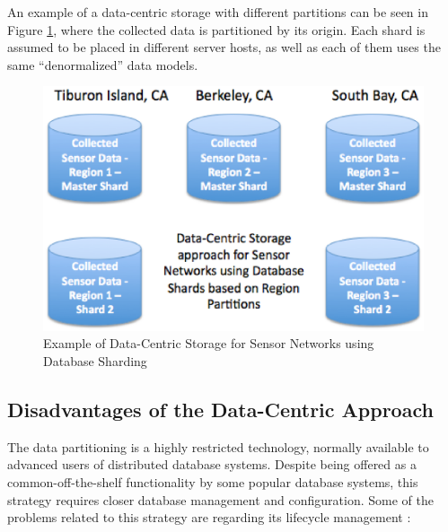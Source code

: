An example of a data-centric storage with different partitions can be seen in
Figure \ref{fig:database-sharding-by-region}, where the collected data is
partitioned by its origin. Each shard is assumed to be placed in different
server hosts, as well as each of them uses the same ``denormalized'' data
models.

\begin{figure}
  \centering
  \includegraphics[scale=0.5]{../diagrams/database-sharding-by-region}
  \caption{Example of Data-Centric Storage for Sensor Networks using Database
  Sharding}
  \label{fig:database-sharding-by-region}
\end{figure}

\subsection{Disadvantages of the Data-Centric Approach}

The data partitioning is a highly restricted technology, normally available to
advanced users of distributed database systems. Despite being offered as a
common-off-the-shelf functionality by some popular database systems, this
strategy requires closer database management and configuration. Some of the
problems related to this strategy are regarding its lifecycle management
\cite{db-shard-discussion}:

